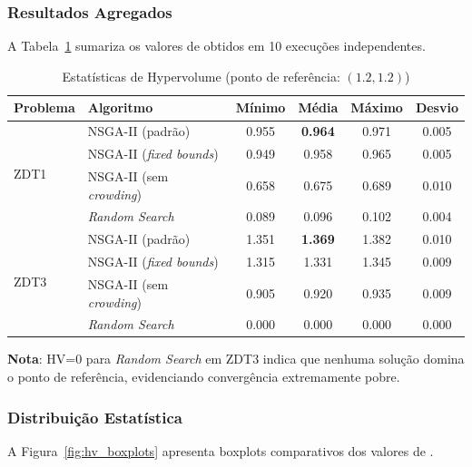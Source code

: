 \subsubsection{Resultados Agregados}

A Tabela~\ref{tab:hypervolume_results} sumariza os valores de \hlv{} obtidos em 10 execuções independentes.

\begin{table}[H]
\centering
\caption{Estatísticas de Hypervolume (ponto de referência: $(1.2, 1.2)$)}
\label{tab:hypervolume_results}
\begin{tabular}{@{}llcccc@{}}
\toprule
\textbf{Problema} & \textbf{Algoritmo} & \textbf{Mínimo} & \textbf{Média} & \textbf{Máximo} & \textbf{Desvio} \\
\midrule
\multirow{4}{*}{ZDT1} 
    & NSGA-II (padrão) & 0.955 & \textbf{0.964} & 0.971 & 0.005 \\
    & NSGA-II (\textit{fixed bounds}) & 0.949 & 0.958 & 0.965 & 0.005 \\
    & NSGA-II (sem \textit{crowding}) & 0.658 & 0.675 & 0.689 & 0.010 \\
    & \textit{Random Search} & 0.089 & 0.096 & 0.102 & 0.004 \\
\midrule
\multirow{4}{*}{ZDT3} 
    & NSGA-II (padrão) & 1.351 & \textbf{1.369} & 1.382 & 0.010 \\
    & NSGA-II (\textit{fixed bounds}) & 1.315 & 1.331 & 1.345 & 0.009 \\
    & NSGA-II (sem \textit{crowding}) & 0.905 & 0.920 & 0.935 & 0.009 \\
    & \textit{Random Search} & 0.000 & 0.000 & 0.000 & 0.000 \\
\bottomrule
\end{tabular}
\end{table}

\textbf{Nota}: HV=0 para \textit{Random Search} em ZDT3 indica que nenhuma solução domina o ponto de referência, evidenciando convergência extremamente pobre.

\subsubsection{Distribuição Estatística}

A Figura~\ref{fig:hv_boxplots} apresenta boxplots comparativos dos valores de \hlv{}.


